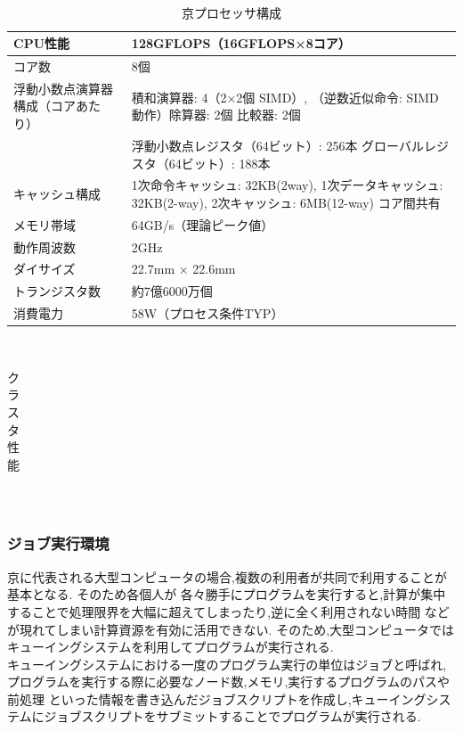 ~\\
\begin{table}[t]
  \begin{center}
    \begin{tabular}{|l|p{10cm}|}
      \hline
      CPU性能 & 128GFLOPS（16GFLOPS×8コア）\\ \hline
      コア数 & 8個\\ \hline
      浮動小数点演算器構成（コアあたり）& 積和演算器: 4（2×2個 SIMD）, （逆数近似命令: SIMD 動作）除算器: 2個 比較器: 2個\\ \cline{1-2}
      & 浮動小数点レジスタ（64ビット）: 256本 グローバルレジスタ（64ビット）: 188本\\ \cline{1-2}
      キャッシュ構成 & 1次命令キャッシュ: 32KB(2way), 1次データキャッシュ: 32KB(2-way), 2次キャッシュ: 6MB(12-way) コア間共有\\ \hline
      メモリ帯域 & 64GB/s（理論ピーク値）\\ \hline
      動作周波数 & 2GHz \\ \hline
      ダイサイズ & 22.7mm × 22.6mm \\ \hline
      トランジスタ数 & 約7億6000万個 \\ \hline
      消費電力 & 58W（プロセス条件TYP）\\ \hline
    \end{tabular}
  \end{center}
  \caption {京プロセッサ構成}
\end{table}
~\\
\begin{table}[htb]
  \begin{center}
    \begin{tabular}{|c|p{12cm}|}
    \end{tabular}
  \end{center}
  \caption {クラスタ性能}
\end{table}
~\\
\subsubsection{ジョブ実行環境}
京に代表される大型コンピュータの場合,複数の利用者が共同で利用することが基本となる. そのため各個人が
各々勝手にプログラムを実行すると,計算が集中することで処理限界を大幅に超えてしまったり,逆に全く利用されない時間
などが現れてしまい計算資源を有効に活用できない. そのため,大型コンピュータではキューイングシステムを利用してプログラムが実行される.\\
キューイングシステムにおける一度のプログラム実行の単位はジョブと呼ばれ,プログラムを実行する際に必要なノード数,メモリ,実行するプログラムのパスや前処理
といった情報を書き込んだジョブスクリプトを作成し,キューイングシステムにジョブスクリプトをサブミットすることでプログラムが実行される.~\\


